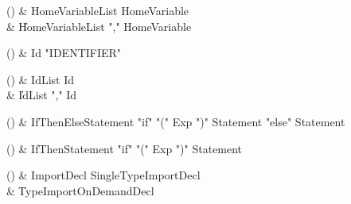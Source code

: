 \begin{bbgrammarappendix}

() & HomeVariableList \label{prod:HomeVariableList}  \: HomeVariable  \\

 &    \| HomeVariableList \xcd"," HomeVariable \\

\end{bbgrammarappendix}

\begin{bbgrammarappendix}

() & Id \label{prod:Id}  \: \xcd"IDENTIFIER"   \\


\end{bbgrammarappendix}

\begin{bbgrammarappendix}

() & IdList \label{prod:IdList}  \: Id  \\

 &    \| IdList \xcd"," Id \\

\end{bbgrammarappendix}

\begin{bbgrammarappendix}

() & IfThenElseStatement \label{prod:IfThenElseStatement}  \: \xcd"if" \xcd"(" Exp \xcd")" Statement  \xcd"else" Statement   \\


\end{bbgrammarappendix}

\begin{bbgrammarappendix}

() & IfThenStatement \label{prod:IfThenStatement}  \: \xcd"if" \xcd"(" Exp \xcd")" Statement  \\


\end{bbgrammarappendix}

\begin{bbgrammarappendix}

() & ImportDecl \label{prod:ImportDecl}  \: SingleTypeImportDecl  \\

 &    \| TypeImportOnDemandDecl \\

\end{bbgrammarappendix}

